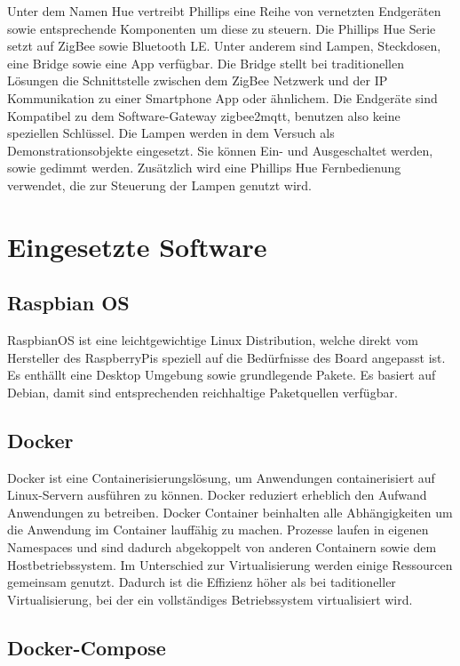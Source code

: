 Unter dem Namen \grqq Hue \grqq{} vertreibt Phillips eine Reihe von vernetzten Endgeräten sowie entsprechende Komponenten um diese zu steuern.
Die Phillips Hue Serie setzt auf ZigBee sowie Bluetooth LE. Unter anderem sind Lampen, Steckdosen, eine Bridge sowie eine App verfügbar.
Die Bridge stellt bei traditionellen Lösungen die Schnittstelle zwischen dem ZigBee Netzwerk und der IP Kommunikation zu einer Smartphone
App oder ähnlichem. Die Endgeräte sind Kompatibel zu dem Software-Gateway zigbee2mqtt, benutzen also keine speziellen Schlüssel.
Die Lampen werden in dem Versuch als Demonstrationsobjekte eingesetzt. Sie können Ein- und Ausgeschaltet werden, sowie gedimmt werden. Zusätzlich wird eine
Phillips Hue Fernbedienung verwendet, die zur Steuerung der Lampen genutzt wird.

\section{Eingesetzte Software}

\subsection{Raspbian OS}

RaspbianOS ist eine leichtgewichtige Linux Distribution, welche direkt vom Hersteller des RaspberryPis speziell auf die Bedürfnisse des Board angepasst ist. Es enthällt eine
Desktop Umgebung sowie grundlegende Pakete. Es basiert auf Debian, damit sind entsprechenden reichhaltige Paketquellen verfügbar. 

\subsection{Docker}

Docker ist eine Containerisierungslösung, um Anwendungen containerisiert auf Linux-Servern ausführen zu können. Docker reduziert erheblich den Aufwand 
Anwendungen zu betreiben. Docker Container beinhalten alle Abhängigkeiten um die Anwendung im Container lauffähig zu machen.
Prozesse laufen in eigenen Namespaces und sind dadurch abgekoppelt von anderen Containern sowie dem Hostbetriebssystem. Im Unterschied zur Virtualisierung werden
einige Ressourcen gemeinsam genutzt. Dadurch ist die Effizienz höher als bei taditioneller Virtualisierung, bei der ein vollständiges Betriebssystem virtualisiert wird.

\subsection{Docker-Compose}

